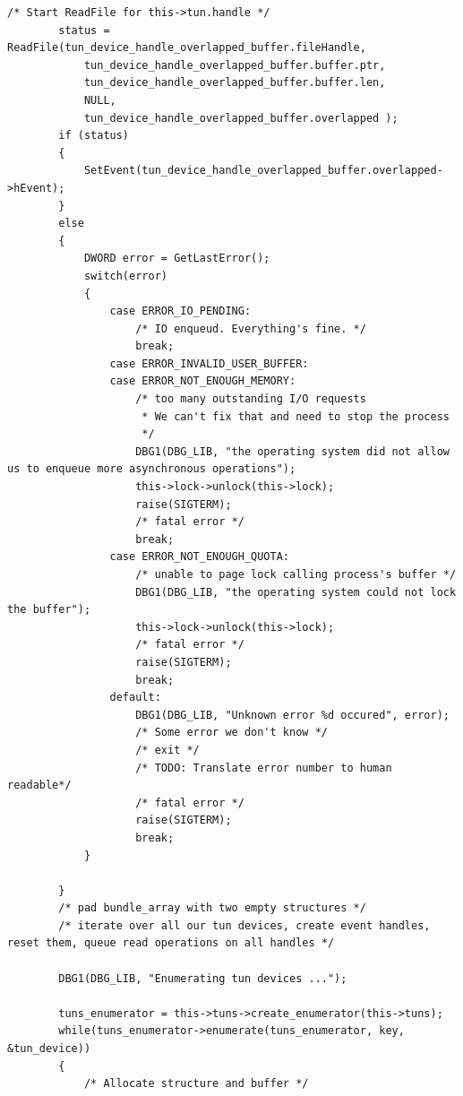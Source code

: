\begin{lstlisting}[caption=Code für handle\_plain auf Windows]
        /* Start ReadFile for this->tun.handle */
        status = ReadFile(tun_device_handle_overlapped_buffer.fileHandle,
            tun_device_handle_overlapped_buffer.buffer.ptr,
            tun_device_handle_overlapped_buffer.buffer.len,
            NULL,
            tun_device_handle_overlapped_buffer.overlapped );
        if (status)
        {
            SetEvent(tun_device_handle_overlapped_buffer.overlapped->hEvent);
        }
        else
        {
            DWORD error = GetLastError();
            switch(error)
            {
                case ERROR_IO_PENDING:
                    /* IO enqueud. Everything's fine. */
                    break;
                case ERROR_INVALID_USER_BUFFER:
                case ERROR_NOT_ENOUGH_MEMORY:
                    /* too many outstanding I/O requests
                     * We can't fix that and need to stop the process
                     */
                    DBG1(DBG_LIB, "the operating system did not allow us to enqueue more asynchronous operations");
                    this->lock->unlock(this->lock);
                    raise(SIGTERM);
                    /* fatal error */
                    break;
                case ERROR_NOT_ENOUGH_QUOTA:
                    /* unable to page lock calling process's buffer */
                    DBG1(DBG_LIB, "the operating system could not lock the buffer");
                    this->lock->unlock(this->lock);
                    /* fatal error */
                    raise(SIGTERM);
                    break;
                default:
                    DBG1(DBG_LIB, "Unknown error %d occured", error);
                    /* Some error we don't know */
                    /* exit */
                    /* TODO: Translate error number to human readable*/
                    /* fatal error */
                    raise(SIGTERM);
                    break;
            }

        }
        /* pad bundle_array with two empty structures */
        /* iterate over all our tun devices, create event handles, reset them, queue read operations on all handles */

        DBG1(DBG_LIB, "Enumerating tun devices ...");

        tuns_enumerator = this->tuns->create_enumerator(this->tuns);
        while(tuns_enumerator->enumerate(tuns_enumerator, key, &tun_device))
        {
            /* Allocate structure and buffer */


\end{lstlisting}

